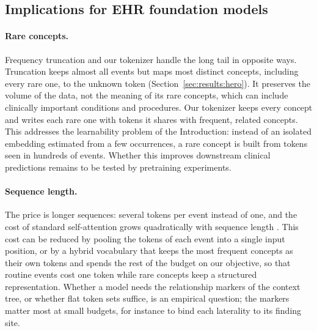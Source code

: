 \subsection{Implications for EHR foundation models}
\label{sec:discussion:ehr}

\paragraph{Rare concepts.}
Frequency truncation and our tokenizer handle the long tail in opposite ways.
Truncation keeps almost all events but maps most distinct concepts, including every rare one, to the unknown token (Section~\ref{sec:results:hero}).
It preserves the volume of the data, not the meaning of its rare concepts, which can include clinically important conditions and procedures.
Our tokenizer keeps every concept and writes each rare one with tokens it shares with frequent, related concepts.
This addresses the learnability problem of the Introduction: instead of an isolated embedding estimated from a few occurrences, a rare concept is built from tokens seen in hundreds of events.
Whether this improves downstream clinical predictions remains to be tested by pretraining experiments.

\paragraph{Sequence length.}
The price is longer sequences: several tokens per event instead of one, and the cost of standard self-attention grows quadratically with sequence length \cite{vaswani2017attention}.
This cost can be reduced by pooling the tokens of each event into a single input position, or by a hybrid vocabulary that keeps the most frequent concepts as their own tokens and spends the rest of the budget on our objective, so that routine events cost one token while rare concepts keep a structured representation.
Whether a model needs the relationship markers of the context tree, or whether flat token sets suffice, is an empirical question; the markers matter most at small budgets, for instance to bind each laterality to its finding site.

